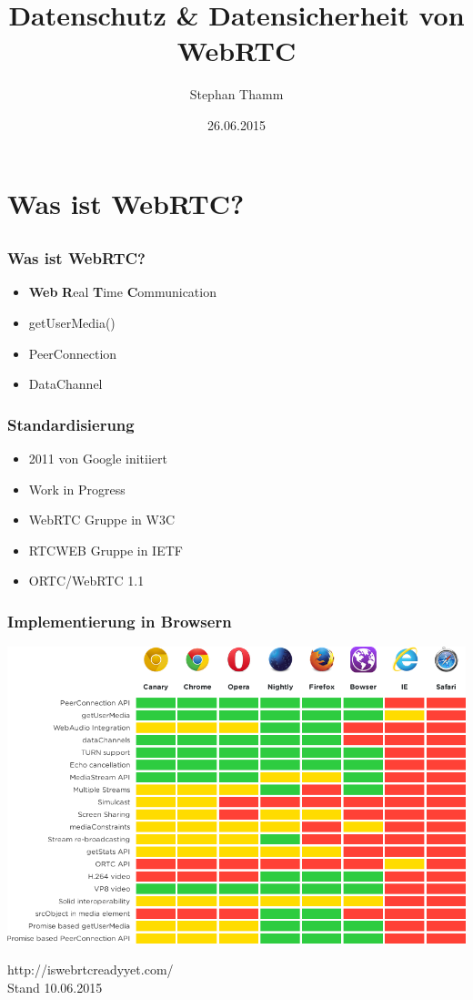 \documentclass[12pt]{beamer}
\title{\small Datenschutz \& Datensicherheit von \\ \huge WebRTC}
\author{Stephan Thamm}
\date{26.06.2015}
\begin{document}
\maketitle

\frame{\tableofcontents[sections={1-4}]}


\section{Was ist WebRTC?}
\subsection{} 

\begin{frame}
  \frametitle{Was ist WebRTC?}
  \begin{itemize}
    \item<2-> \textbf{Web} \textbf{R}eal \textbf{T}ime \textbf{C}ommunication
    \item<3-> getUserMedia()
    \item<4-> PeerConnection
    \item<5-> DataChannel
  \end{itemize}
\end{frame}

\begin{frame}
  \frametitle{Standardisierung}
  \begin{itemize}
    \item<2-> 2011 von Google initiiert
    \item<3-> Work in Progress
    \item<4-> WebRTC Gruppe in W3C
    \item<5-> RTCWEB Gruppe in IETF
    \item<6-> ORTC/WebRTC 1.1
  \end{itemize}
\end{frame}

\begin{frame}
  \frametitle{Implementierung in Browsern}
  \pause
  \centerline{\includegraphics[height=0.7\textheight]{img/webrtc_ready.png}}
  \hfill \tiny http://iswebrtcreadyyet.com/ \\
  \hfill \tiny Stand 10.06.2015
\end{frame}
\end{document}
